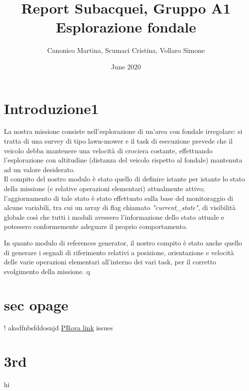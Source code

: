 \documentclass{article}
\title{Report Subacquei, Gruppo A1\\
Esplorazione fondale}
\author{Canonico Martina, Scumaci Cristina, Vollaro Simone}
\date{June 2020}
\begin{document}
    
    
    \newpage
    \tableofcontents
    \thispagestyle{empty}
    
    
    \newpage
    
    \section{Introduzione1}
    La nostra missione consiste nell'esplorazione di un'area con fondale irregolare: si tratta di una survey di tipo lawn-mower e il task
    di esecuzione prevede che il veicolo debba mantenere una velocità di crociera costante, effettuando l'esplorazione con altitudine 
    (distanza del veicolo rispetto al fondale) mantenuta ad un valore desiderato.
    \\
    \noindent
    Il compito del nostro modulo è stato quello di definire istante per istante lo stato della missione (e relative operazioni elementari) attualmente attivo;
    l’aggiornamento di tale stato è stato effettuato sulla base del monitoraggio di alcune variabili, tra cui un array di flag
    chiamato \textit{"current\_state"}, di visibilità globale così che tutti i moduli avessero l'informazione dello stato attuale e
    potessero conformemente adeguare il proprio comportamento.
	
    \vspace{\baselineskip}
    In quanto modulo di references generator, il nostro compito è stato anche quello di generare i segnali di riferimento relativi a posizione,
    orientazione e velocità delle varie operazioni elementari all'interno dei vari task, per il corretto svolgimento della missione.
 q       
    \newpage
    \section{sec opage}!
    aksdfnbsfddosnjd
    \hyperref[hihi]{PRova link}\cite{stateflow}
    issues
    \newpage
    \section{3rd}%
    hi\label{hihi}
    
    \newpage
    \printbibliography
\end{document}
